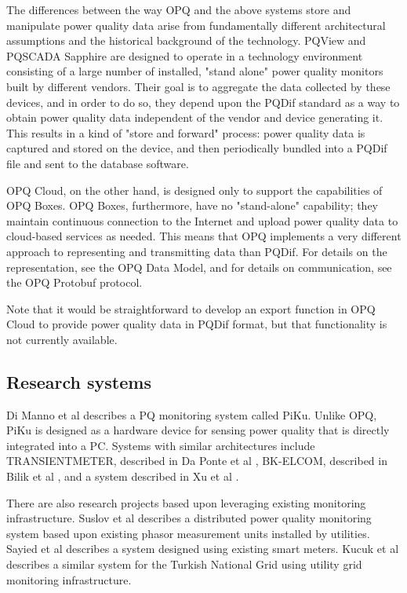The differences between the way OPQ and the above systems store and manipulate power quality data arise from fundamentally different architectural assumptions and the historical background of the technology. PQView and PQSCADA Sapphire are designed to operate in a technology environment consisting of a large number of installed, "stand alone" power quality monitors built by different vendors. Their goal is to aggregate the data collected by these devices, and in order to do so, they depend upon the PQDif standard as a way to obtain power quality data independent of the vendor and device generating it. This results in a kind of "store and forward" process: power quality data is captured and stored on the device, and then periodically bundled into a PQDif file and sent to the database software.

OPQ Cloud, on the other hand, is designed only to support the capabilities of OPQ Boxes. OPQ Boxes, furthermore, have no "stand-alone" capability; they maintain continuous connection to the Internet and upload power quality data to cloud-based services as needed. This means that OPQ implements a very different approach to representing and transmitting data than PQDif. For details on the representation, see the OPQ Data Model, and for details on communication, see the OPQ Protobuf protocol.

Note that it would be straightforward to develop an export function in OPQ Cloud to provide power quality data in PQDif format, but that functionality is not currently available.

\subsection{Research systems}

Di Manno et al \cite{di_manno_user_2015} describes a PQ monitoring system called PiKu. Unlike OPQ, PiKu is designed as a hardware device for sensing power quality that is directly integrated into a PC. Systems with similar architectures include TRANSIENTMETER, described in Da Ponte et al \cite{daponte_transientmeter:_2000}, BK-ELCOM, described in Bilik et al \cite{bilik_modular_2007}, and a system described in Xu et al \cite{xu_distributed_2012}.

There are also research projects based upon leveraging existing monitoring infrastructure. Suslov et al \cite{suslov_distributed_2014} describes a distributed power quality monitoring system based upon existing phasor measurement units installed by utilities. Sayied et al \cite{sayied_power_2013} describes a system designed using existing smart meters. Kucuk et al \cite{kucuk_extensible_2010} describes a similar system for the Turkish National Grid using utility grid monitoring infrastructure.

